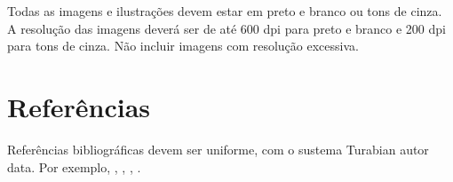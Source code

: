 \documentclass[12pt]{article}
\begin{document}
Todas as imagens e ilustrações devem estar em preto e branco ou tons
de cinza. A resolução das imagens deverá ser de até 600 dpi para preto
e branco e 200 dpi para tons de cinza. Não incluir imagens com
resolução excessiva.

\section{Referências}

Referências bibliográficas devem ser uniforme, com o sustema Turabian
autor data. Por exemplo, \cite{kroger04:desenvolvendo},
\cite{babbitt61:set}, \cite{coutinho.ea05:computational},
\cite{morris87:composition}.


\end{document}
